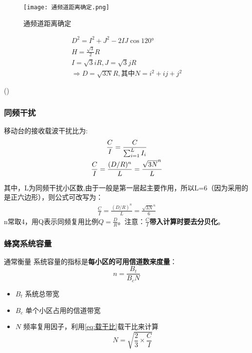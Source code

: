 	\begin{figure}[H]
		\centering
		\texttt{[image: 通频道距离确定.png]}
		\caption{通频道距离确定}
	\end{figure}
	\begin{minipage}[c]{0.8\linewidth}
			\begin{gather*}
		D^2 = I^2 + J^2 - 2IJ\cos120°	\\
		H = \frac{\sqrt{3}}{2}R	\\
		I = \sqrt{3}iR,J = \sqrt{3}jR	\\
		\Rightarrow 
		D = \sqrt{3N}R,\text{其中}N = i^2+ij+j^2
		\end{gather*} 
	\end{minipage}
	\begin{minipage}[r]{0.2\linewidth}
		(\theequation)
	\end{minipage}
	
	\subsubsection{同频干扰}
	移动台的接收载波干扰比为: \\

	\begin{gather}
		\frac{C}{I} = \frac{C}{\sum_{i=1}^{L}I_i} \notag  \\
		\frac{C}{I} = \frac{(D/R)^n}{L}=\frac{\sqrt{3N}^n}{L} 
		\label{eq:载干比}
	\end{gather}

	其中，L为同频干扰小区数,由于一般是第一层起主要作用，所以L=6（因为采用的是正六边形），则公式可改写为：
	\begin{eqnarray}
	\frac{C}{I} = \frac{(D/R)^n}{L}=\frac{\sqrt{3N}^n}{6} 
	\end{eqnarray}
	n常取4，用Q表示同频复用比例$Q = \frac{D}{R}$。注意：\textbf{\(\frac{C}{I}\)带入计算时要去分贝化}。
	\subsubsection{蜂窝系统容量}
	通常衡量
	系统容量的指标是\textbf{每小区的可用信道数来度量}：
	\begin{equation}
		n = \frac{B_t}{B_cN}
	\end{equation}
	\begin{itemize}
		\item $B_t$ 系统总带宽
		\item $B_c$ 单个小区占用的信道带宽
		\item $N$ 频率复用因子，利用\ref{eq:载干比}载干比来计算
		\begin{equation*}
			N = \sqrt{\frac{2}{3}\times \frac{C}{I}}
		\end{equation*}
	\end{itemize}
		
